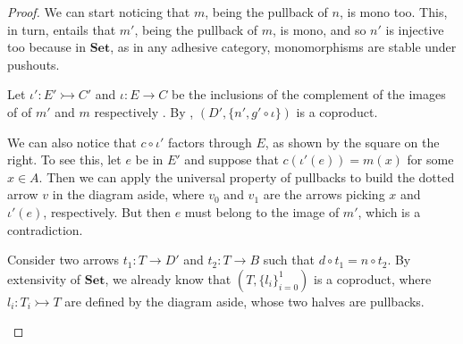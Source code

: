\documentclass[3p]{elsarticle}
\newcommand{\Set}{\mathbf{Set}}
\newcommand{\mto}{\rightarrowtail}
\theoremstyle{remark}
\theoremstyle{definition}
\begin{document}
\begin{proof}\label{proof:kerset}
	We can start noticing that $m$, being the pullback of $n$, is mono too. This, in turn, entails that $m'$, being the pullback of $m$, is mono, and so $n'$ is injective too because in $\Set$, as in any adhesive category, monomorphisms are stable under pushouts. 
	
	\noindent
	\begin{minipage}[l]{.83\linewidth}
			\setlength{\parindent}{1.5em}
	Let $\iota' \colon E'\mto C'$ and $\iota\colon E\to C$ be the inclusions of the complement of the images of of $m'$ and $m$ respectively . By , $(D', \{n', g'\circ \iota\})$ is a coproduct.	\end{minipage}
	\hfill
	\begin{minipage}[r]{.2\linewidth}
	\end{minipage}

	\noindent
	\begin{minipage}[l]{.75\linewidth}
	\setlength{\parindent}{1.5em}
We can also notice that $c\circ \iota'$ factors through $E$, as shown by the square on the right. To see this, let $e$ be in $E'$ and suppose that  $c(\iota'(e))=m(x)$ for some $x\in A$. Then we can apply the  universal property of pullbacks to build the dotted arrow $v$ in the diagram aside, where $v_0$ and $v_1$ are the arrows picking $x$ and $\iota'(e)$, respectively. But then $e$ must belong to the image of $m'$, which is a contradiction.
\end{minipage}\hfill 
\begin{minipage}[r]{.35\linewidth}
\end{minipage}
	\begin{enumerate}
		\begin{minipage}[l]{.75\linewidth}
			\setlength{\parindent}{1.5em}
			\item Consider two arrows $t_1\colon T\to D' $ and $t_2\colon T\to B$ such that $d\circ t_1=n\circ t_2$. By extensivity of $\Set$, we already know that $(T, \{l_i\}_{i=0}^1)$ is a coproduct, where $l_i\colon T_i\mto T$ are defined by the diagram aside, whose two halves are pullbacks. 	\end{minipage}
			\hfill 
			\begin{minipage}[r]{.25\linewidth}
			\end{minipage}
		

\end{enumerate}
\end{proof}
\end{document}
